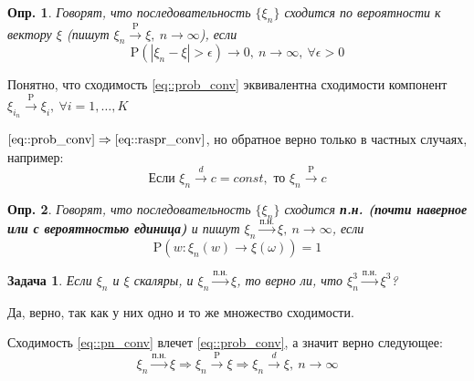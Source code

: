 \documentclass[12pt]{article}
\newtheorem{definition}{Опр.}
\newtheorem*{task}{Задача}
\theoremstyle{basic_theorem}
\theoremstyle{name_theorem}
\newcommand\defin[1]{\textbf{#1}}
\def\P{
    \mathrm{P}
}
\begin{document}
\begin{definition}
    Говорят, что последовательность $\{\xi_n\}$ 
    сходится по вероятности к вектору $\xi$ (пишут $\xi_n\xrightarrow{\P}\xi,\ n\rightarrow\infty$),
    если 
    \begin{equation} \label{eq::prob_conv}
        \P(|\xi_n - \xi| > \epsilon) \rightarrow 0,\ n\rightarrow\infty,\ \forall \epsilon>0 
    \end{equation}
\end{definition}

Понятно, что сходимость \eqref{eq::prob_conv}
эквивалентна сходимости компонент $\xi_{i_n}\xrightarrow{\P}\xi_i,\ \forall i=1,\ldots,K$

$\eqref{eq::prob_conv} \Rightarrow \eqref{eq::raspr_conv}$, но
обратное верно только в частных случаях, например:
$$\text{Если } \xi_n\xrightarrow{d} c = const,\text{ то }  \xi_n \xrightarrow{\P} c$$

\begin{definition}
    Говорят, что последовательность $\{\xi_n\}$ сходится \defin{п.н. (почти наверное
    или с вероятностью единица)} и пишут $\xi_n\xrightarrow{\text{п.н.}}\xi,\ n\rightarrow\infty$,
    если
    \begin{equation} \label{eq::pn_conv}
        \P(w: \xi_n(w)\rightarrow\xi(\omega)) = 1
    \end{equation}
\end{definition}
\begin{task}
    Если $\xi_n$ и $\xi$ скаляры, и $\xi_n\xrightarrow{\text{п.н.}}\xi$, то верно ли, что
    $\xi_n^3\xrightarrow{\text{п.н.}}\xi^3$?
\end{task}
    Да, верно, так как у них одно и то же множество сходимости.

    Сходимость \eqref{eq::pn_conv} влечет \eqref{eq::prob_conv}, а значит верно следующее:
    $$\xi_n\xrightarrow{\text{п.н.}}\xi\Rightarrow \xi_n\xrightarrow{\P}\xi\Rightarrow\xi_n\xrightarrow{d}\xi,\ n\rightarrow\infty $$
\end{document}
